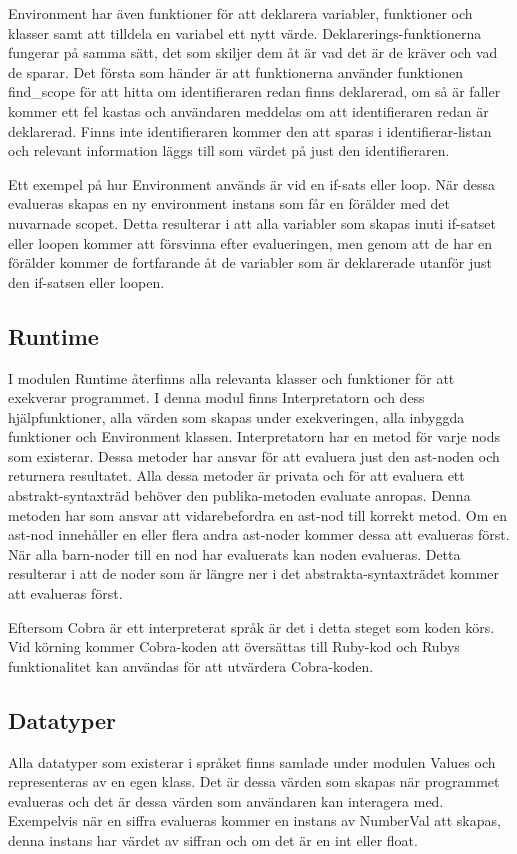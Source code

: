\documentclass{TDP003mall}
\begin{document}
Environment har även funktioner för att deklarera variabler, funktioner och klasser samt att tilldela en variabel ett nytt värde.
Deklarerings-funktionerna fungerar på samma sätt, det som skiljer dem åt är vad det är de kräver och vad de sparar.
Det första som händer är att funktionerna använder funktionen find\_scope för att hitta om identifieraren redan finns deklarerad, om så är faller kommer ett fel kastas och användaren meddelas om att identifieraren redan är deklarerad.
Finns inte identifieraren kommer den att sparas i identifierar-listan och relevant information läggs till som värdet på just den identifieraren.

Ett exempel på hur Environment används är vid en if-sats eller loop.
När dessa evalueras skapas en ny environment instans som får en förälder med det nuvarnade scopet.
Detta resulterar i att alla variabler som skapas inuti if-satset eller loopen kommer att försvinna efter evalueringen, men genom att de har en förälder kommer de fortfarande åt de variabler som är deklarerade utanför just den if-satsen eller loopen.

\subsection{Runtime}
I modulen Runtime återfinns alla relevanta klasser och funktioner för att exekverar programmet.
I denna modul finns Interpretatorn och dess hjälpfunktioner, alla värden som skapas under exekveringen, alla inbyggda funktioner och Environment klassen.
Interpretatorn har en metod för varje nods som existerar. Dessa metoder har ansvar för att evaluera just den ast-noden och returnera resultatet.
Alla dessa metoder är privata och för att evaluera ett abstrakt-syntaxträd behöver den publika-metoden evaluate anropas.
Denna metoden har som ansvar att vidarebefordra en ast-nod till korrekt metod.
Om en ast-nod innehåller en eller flera andra ast-noder kommer dessa att evalueras först.
När alla barn-noder till en nod har evaluerats kan noden evalueras. 
Detta resulterar i att de noder som är längre ner i det abstrakta-syntaxträdet kommer att evalueras först.

Eftersom Cobra är ett interpreterat språk är det i detta steget som koden körs. 
Vid körning kommer Cobra-koden att översättas till Ruby-kod och Rubys funktionalitet kan användas för att utvärdera Cobra-koden.

\subsection{Datatyper}
Alla datatyper som existerar i språket finns samlade under modulen Values och representeras av en egen klass.
Det är dessa värden som skapas när programmet evalueras och det är dessa värden som användaren kan interagera med.
Exempelvis när en siffra evalueras kommer en instans av NumberVal att skapas, denna instans har värdet av siffran och om det är en int eller float.
\end{document}
